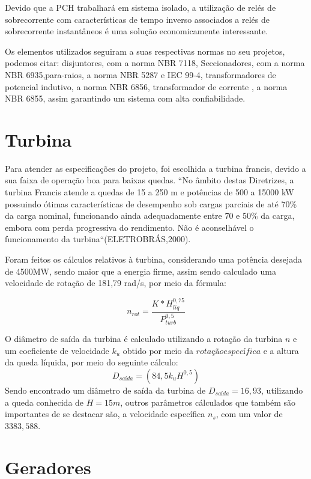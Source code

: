 Devido que a PCH trabalhará em sistema isolado, a utilização de relés de sobrecorrente com características de tempo inverso associados a relés de sobrecorrente instantâneos é uma solução economicamente interessante.

Os elementos utilizados seguiram a suas respectivas normas no seu projetos, podemos citar: disjuntores, com a norma NBR 7118, Seccionadores, com a norma NBR 6935,para-raios, a norma NBR 5287 e IEC 99-4, transformadores de potencial indutivo, a norma NBR 6856, transformador de corrente , a norma NBR 6855, assim garantindo um sistema com alta confiabilidade.

\section{Turbina}
Para atender as especificações do projeto, foi escolhida a turbina francis, devido a sua faixa de operação boa para baixas quedas. “No âmbito destas Diretrizes, a turbina Francis atende a quedas de 15 a 250 m e potências de 500 a 15000 kW possuindo ótimas características de desempenho sob cargas parciais de  até 70\% da carga nominal, funcionando ainda adequadamente entre 70 e 50\% da carga, embora com perda progressiva do rendimento. Não é aconselhável o funcionamento da turbina“(ELETROBRÁS,2000).

Foram feitos os cálculos relativos à turbina, considerando uma potência desejada de 4500MW, sendo maior que a energia firme, assim sendo calculado uma velocidade de rotação de 181,79 rad/s, por meio da fórmula:

\begin{equation}
	n_{rot}= \dfrac{K*H^{0,75}_{liq}}{P_{turb}^{0,5}}
	\end{equation}

O diâmetro de saída da turbina é calculado utilizando a rotação da turbina $n$ e um coeficiente de velocidade $k_u$ obtido por meio da $rotação específica$ e a altura da queda líquida, por meio do seguinte cálculo:
\begin{equation}
	D_{saída}=(84,5k_uH^{0,5})
\end{equation}
Sendo encontrado um diâmetro de saída da turbina de $D_{saída}=16,93$, utilizando a queda conhecida de $H=15m$, outros parâmetros cálculados que também são importantes de se destacar são, a velocidade específica $n_s$, com um valor de $3383,588$.

\section{Geradores}
